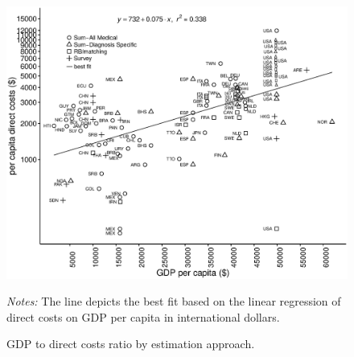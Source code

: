 \documentclass[12pt,english]{article}
\begin{document}
\begin{figure}[hp]
\caption{\label{fig:review_GDPtocost_ratio}\ac{GDP} to direct costs ratio by estimation approach.}%
\begin{minipage}{\linewidth}
\begin{center}
\includegraphics[width=1\linewidth]{Review/Figures/Fig3.eps}\\
\end{center}
\footnotesize
\emph{Notes:}  The line depicts the best fit based on the linear regression of direct costs on \ac{GDP} per capita in international dollars.
\end{minipage}
\end{figure}
\end{document}
